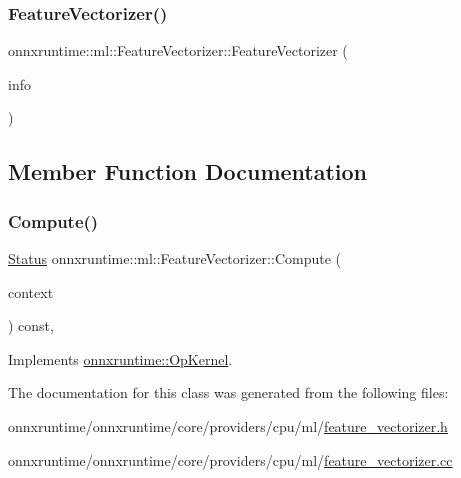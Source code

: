 \subsubsection{\texorpdfstring{Feature\+Vectorizer()}{FeatureVectorizer()}}
{\footnotesize\ttfamily onnxruntime\+::ml\+::\+Feature\+Vectorizer\+::\+Feature\+Vectorizer (\begin{DoxyParamCaption}\item[{const \mbox{\hyperlink{classonnxruntime_1_1OpKernelInfo}{Op\+Kernel\+Info}} \&}]{info }\end{DoxyParamCaption})\hspace{0.3cm}{\ttfamily [inline]}}



\subsection{Member Function Documentation}
\mbox{\label{classonnxruntime_1_1ml_1_1FeatureVectorizer_afe6a02cf5385d469dd3a59ceb4661537}} 
\subsubsection{\texorpdfstring{Compute()}{Compute()}}
{\footnotesize\ttfamily \mbox{\hyperlink{classonnxruntime_1_1common_1_1Status}{Status}} onnxruntime\+::ml\+::\+Feature\+Vectorizer\+::\+Compute (\begin{DoxyParamCaption}\item[{\mbox{\hyperlink{classonnxruntime_1_1OpKernelContext}{Op\+Kernel\+Context}} $\ast$}]{context }\end{DoxyParamCaption}) const\hspace{0.3cm}{\ttfamily [override]}, {\ttfamily [virtual]}}



Implements \mbox{\hyperlink{classonnxruntime_1_1OpKernel_a9eca8656a78b1b3ab9d3351a12798650}{onnxruntime\+::\+Op\+Kernel}}.



The documentation for this class was generated from the following files\+:\begin{DoxyCompactItemize}
\item 
onnxruntime/onnxruntime/core/providers/cpu/ml/\mbox{\hyperlink{feature__vectorizer_8h}{feature\+\_\+vectorizer.\+h}}\item 
onnxruntime/onnxruntime/core/providers/cpu/ml/\mbox{\hyperlink{feature__vectorizer_8cc}{feature\+\_\+vectorizer.\+cc}}\end{DoxyCompactItemize}
